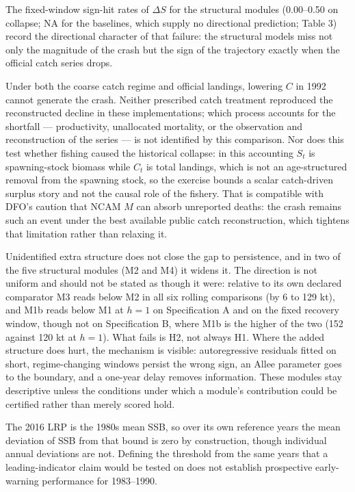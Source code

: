 \documentclass[11pt]{article}
\begin{document}
The fixed-window sign-hit rates of \(\Delta S\) for the structural
modules (0.00--0.50 on collapse; NA for the baselines, which supply no
directional prediction; Table 3) record the directional character of that failure: the
structural models miss not only the magnitude of the crash but the sign
of the trajectory exactly when the official catch series drops.

Under both the coarse catch regime and official landings, lowering \(C\)
in 1992 cannot generate the crash. Neither prescribed catch treatment reproduced the reconstructed decline
in these implementations; which process accounts for the shortfall ---
productivity, unallocated mortality, or the observation and
reconstruction of the series --- is not identified by this comparison.
Nor does this test whether fishing caused the historical collapse: in
this accounting \(S_t\) is spawning-stock biomass while \(C_t\) is total
landings, which is not an age-structured removal from the spawning
stock, so the exercise bounds a scalar catch-driven surplus story and
not the causal role of the fishery. That is
compatible with DFO's caution that NCAM \(M\) can absorb unreported
deaths: the crash remains such an event under the best available public
catch reconstruction, which tightens that limitation rather than
relaxing it.

Unidentified extra structure does not close the gap to persistence, and
in two of the five structural modules (M2 and M4) it widens it. The direction is not uniform
and should not be stated as though it were: relative to its own declared
comparator M3 reads below M2 in all six rolling comparisons (by 6 to 129
kt), and M1b reads below M1 at \(h=1\) on Specification A and on the
fixed recovery window, though not on Specification B, where M1b is the
higher of the two (152 against 120 kt at \(h=1\)). What fails is H2, not always H1. Where the added
structure does hurt, the mechanism is visible: autoregressive residuals
fitted on short, regime-changing windows persist the wrong sign, an
Allee parameter goes to the boundary, and a one-year delay removes
information. These modules stay descriptive unless the conditions under
which a module's contribution could be certified rather than merely
scored hold.

The 2016 LRP is the 1980s mean SSB, so over its own reference years the
mean deviation of SSB from that bound is zero by construction, though
individual annual deviations are not. Defining the threshold from the
same years that a leading-indicator claim would be tested on does not
establish prospective early-warning performance for 1983--1990.
\end{document}
